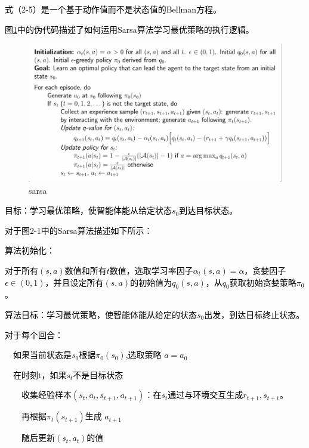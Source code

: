 \textcolor{black}{式（2-5）是一个基于动作值而不是状态值的Bellman方程。}

\textcolor{black}{图\ref{fig:sarsa}中的伪代码描述了如何运用Sarsa算法学习最优策略的执行逻辑。}

\begin{figure}
  \centering
  \includegraphics[]{images/sarsa.png}
  \caption{sarsa}\label{fig:sarsa}
\end{figure}

\textcolor{black}{目标：学习最优策略，使智能体能从给定状态$s_{0}$到达目标状态。}

\textcolor{black}{对于图2-1中的Sarsa算法描述如下所示：}

\textcolor{black}{算法初始化：}

\textcolor{black}{对于所有$\left({s,a}\right)$数值和所有$t$数值，选取学习率因子${\alpha}_{t}\left({s,a}\right) = {\alpha}$，贪婪因子${\epsilon}\in({0,1})$，并且设定所有$\left({s,a}\right)$的初始值为${q}_{0}\left({s,a}\right)$，从${q}_{0}$获取初始贪婪策略${\pi}_{0}$。}

\textcolor{black}{算法目标：学习最优策略，使智能体能从给定的状态${s}_{0}$出发，到达目标终止状态。}

\textcolor{black}{对于每个回合：}

\textcolor{black}{\ \ 如果当前状态是${s}_{0}$根据$ {\pi}_{0}\left({s}_{0}\right)$,选取策略 $a ={a}_{0}$}

\textcolor{black}{\ \  在时刻t，如果${s}_{t}$不是目标状态}

\textcolor{black}{\ \ \ \  收集经验样本$({s}_{t}, {a}_{t}, {s}_{{t+1}}, {a}_{{t+1}})$：在${s}_{t}$通过与环境交互生成${r}_{{t+1}},{s}_{{t+1}}$。}

\textcolor{black}{\ \ \ \ 再根据${\pi}_{t}\left({s}_{{t+1}}\right)$生成 ${a}_{{t+1}}$}

\textcolor{black}{\ \ \ \  随后更新$({s}_{t}, {a}_{t})$的值}

